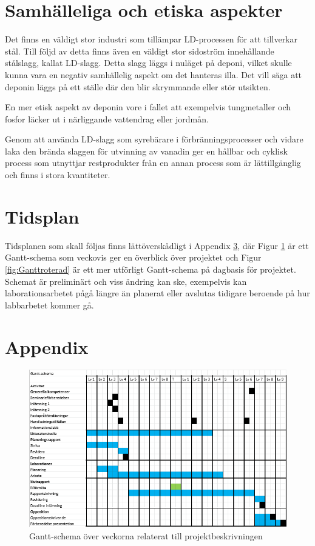 \documentclass{article}
\begin{document}
\section{Samhälleliga och etiska aspekter}
Det finns en  väldigt stor industri som tillämpar LD-processen för att tillverkar stål. Till följd av detta finns även en väldigt stor sidoström innehållande stålslagg, kallat LD-slagg. Detta slagg läggs i nuläget på deponi, vilket skulle kunna vara en negativ samhällelig aspekt om det hanteras illa. Det vill säga att deponin läggs på ett ställe där den blir skrymmande eller stör utsikten. 

En mer etisk aspekt av deponin vore i fallet att exempelvis tungmetaller och fosfor läcker ut i närliggande vattendrag eller jordmån.

Genom att använda LD-slagg som syrebärare i förbränningsprocesser och vidare laka den brända slaggen för utvinning av vanadin ger en hållbar och cyklisk process som utnyttjar restprodukter från en annan process som är lättillgänglig och finns i stora kvantiteter.

\section{Tidsplan}
Tidsplanen som skall följas finns lättöverskådligt i Appendix \ref{appendix}, där Figur \ref{fig:Ganttliten} är ett Gantt-schema som veckovis ger en överblick över projektet och Figur \ref{fig:Ganttroterad} är ett mer utförligt Gantt-schema på dagbasis för projektet. Schemat är preliminärt och viss ändring kan ske, exempelvis kan laborationsarbetet pågå längre än planerat eller avslutas tidigare beroende på hur labbarbetet kommer gå.

\newpage
\printbibliography
\thispagestyle{empty}
\newpage
\appendix
\section{Appendix} \label{appendix}
\begin{figure}[H]
    \centering
    \includegraphics[scale=0.8]{Ganttliten.PNG}
    \caption{Gantt-schema över veckorna relaterat till projektbeskrivningen}
    \label{fig:Ganttliten}
\end{figure}
\end{document}
